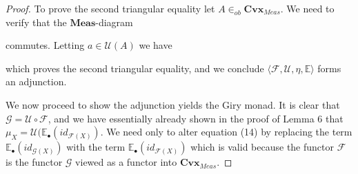 \documentclass[10pt,a4paper]{amsart}
\newcommand{\F}{\mathcal{F}}
\newcommand{\G}{\mathcal{G}}
\begin{document}
\begin{proof}
To prove the second triangular equality let $A \in_{ob} \mathbf{Cvx}_{Meas}$.  We need to verify that the $\mathbf{Meas}$-diagram 
\begin{center}
\end{center}
commutes.  Letting $a \in \mathcal{U}(A)$ we have
\begin{center}
\end{center}
which proves the second triangular equality, and we conclude $\langle \mathcal{F}, \mathcal{U}, \eta, \mathbb{E} \rangle$ forms an adjunction.

We now proceed to show the adjunction yields the Giry monad.  It is clear that $\G = \mathcal{U} \circ \mathcal{F}$, and we have essentially already shown in the proof of Lemma 6 that $\mu_X = \mathcal{U}\big(\mathbb{E}_{\bullet}(id_{\mathcal{F}(X)})$.  We need only to alter equation (14) by replacing the term $\mathbb{E}_{\bullet}(id_{\G(X)})$ with the term $\mathbb{E}_{\bullet}(id_{\F(X)})$ which is valid because the functor $\F$ is the functor $\G$ viewed as a functor into $\mathbf{Cvx}_{Meas}$.
\end{proof}
\end{document}

